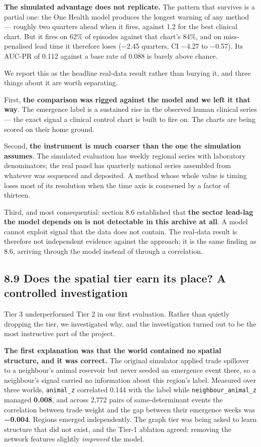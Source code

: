 \documentclass[11pt,a4paper]{article}
\begin{document}
\textbf{The simulated advantage does not replicate.} The pattern that survives is a partial one: the One Health model produces the longest warning of any method — roughly two quarters ahead when it fires, against 1.2 for the best clinical chart. But it fires on 62\% of episodes against that chart's 84\%, and on miss-penalised lead time it therefore loses (−2.45 quarters, CI −4.27 to −0.57). Its AUC-PR of 0.112 against a base rate of 0.088 is barely above chance.

We report this as the headline real-data result rather than burying it, and three things about it are worth separating.

First, \textbf{the comparison was rigged against the model and we left it that way}. The emergence label is a sustained rise in the observed human clinical series — the exact signal a clinical control chart is built to fire on. The charts are being scored on their home ground.

Second, \textbf{the instrument is much coarser than the one the simulation assumes}. The simulated evaluation has weekly regional series with laboratory denominators; the real panel has quarterly national series assembled from whatever was sequenced and deposited. A method whose whole value is timing loses most of its resolution when the time axis is coarsened by a factor of thirteen.

Third, and most consequential: section 8.6 established that \textbf{the sector lead-lag the model depends on is not detectable in this archive at all}. A model cannot exploit signal that the data does not contain. The real-data result is therefore not independent evidence against the approach; it is the same finding as 8.6, arriving through the model instead of through a correlation.

\subsection*{8.9 Does the spatial tier earn its place? A controlled investigation}

Tier 3 underperformed Tier 2 in our first evaluation. Rather than quietly dropping the tier, we investigated why, and the investigation turned out to be the most instructive part of the project.

\textbf{The first explanation was that the world contained no spatial structure, and it was correct.} The original simulator applied trade spillover to a neighbour's animal reservoir but never seeded an emergence event there, so a neighbour's signal carried no information about this region's label. Measured over three worlds, \texttt{animal\_z} correlated 0.144 with the label while \texttt{neighbour\_animal\_z} managed \textbf{0.008}, and across 2,772 pairs of same-determinant events the correlation between trade weight and the gap between their emergence weeks was \textbf{−0.004}. Regions emerged independently. The graph tier was being asked to learn structure that did not exist, and the Tier-1 ablation agreed: removing the network features slightly \emph{improved} the model.
\end{document}
